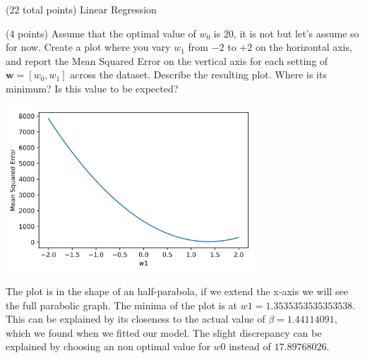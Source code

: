\documentclass[12pt]{article}
\begin{document}
\begin{question}{(22 total points) Linear Regression}
\begin{subquestion}
\end{subquestion}




%
%
\begin{subquestion}{(4 points) Assume that the optimal value of $w_0$ is $20$, it is not but let's assume so for now. 
Create a plot where you vary $w_1$ from $-2$ to $+2$ on the horizontal axis, and report the Mean Squared Error on the vertical axis for each setting of $\mathbf{w} = [w_0, w_1]$ across the dataset. 
Describe the resulting plot. Where is its minimum? Is this value to be expected?\\ 
}


\begin{answerbox}{35em}
\begin{center}
\includegraphics[width=0.7\textwidth]{results/mse-vs-ws.png}
\end{center}
The plot is in the shape of an half-parabola, if we extend the x-axis we will see the full parabolic graph. The minima of the plot is at $w1 = 1.3535353535353538$. This can be explained by its closeness to the actual value of $\beta = 1.44114091$, which we found when we fitted our model. The slight discrepancy can be explained by choosing an non optimal value for $w0$ instead of $17.89768026$.

\end{answerbox}



\end{subquestion}


 
\end{question}





\clearpage
\end{document}
